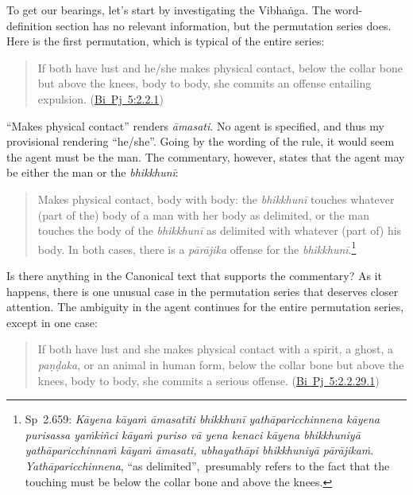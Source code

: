 \documentclass[12pt,openany]{book}%
\begin{document}
To get our bearings, let’s start by investigating the \textsanskrit{Vibhaṅga}. The word-definition section has no relevant information, but the permutation series does. Here is the first permutation, which is typical of the entire series:

\begin{quotation}%
If both have lust and he/she makes physical contact, below the collar bone but above the knees, body to body, she commits an offense entailing expulsion. (\href{https://suttacentral.net/pli-tv-bi-vb-pj5/en/brahmali\#2.2.1}{Bi~Pj~5:2.2.1})

%
\end{quotation}

“Makes physical contact” renders \textit{\textsanskrit{āmasati}}. No agent is specified, and thus my provisional rendering “he/she”. Going by the wording of the rule, it would seem the agent must be the man. The commentary, however, states that the agent may be either the man or the \textit{\textsanskrit{bhikkhunī}}:

\begin{quotation}%
Makes physical contact, body with body: the \textit{\textsanskrit{bhikkhunī}} touches whatever (part of the) body of a man with her body as delimited, or the man touches the body of the \textit{\textsanskrit{bhikkhunī}} as delimited with whatever (part of) his body. In both cases, there is a \textit{\textsanskrit{pārājika}} offense for the \textit{\textsanskrit{bhikkhunī}}.\footnote{Sp 2.659: \textit{\textsanskrit{Kāyena} \textsanskrit{kāyaṁ} \textsanskrit{āmasatīti} \textsanskrit{bhikkhunī} \textsanskrit{yathāparicchinnena} \textsanskrit{kāyena} purisassa \textsanskrit{yaṁkiñci} \textsanskrit{kāyaṁ} puriso \textsanskrit{vā} yena kenaci \textsanskrit{kāyena} \textsanskrit{bhikkhuniyā} \textsanskrit{yathāparicchinnaṁ} \textsanskrit{kāyaṁ} \textsanskrit{āmasati}, \textsanskrit{ubhayathāpi} \textsanskrit{bhikkhuniyā} \textsanskrit{pārājikaṁ}}. \textit{\textsanskrit{Yathāparicchinnena}}, “as delimited”, presumably refers to the fact that the touching must be below the collar bone and above the knees. }

%
\end{quotation}

Is there anything in the Canonical text that supports the commentary? As it happens, there is one unusual case in the permutation series that deserves closer attention. The ambiguity in the agent continues for the entire permutation series, except in one case:

\begin{quotation}%
If both have lust and she makes physical contact with a spirit, a ghost, a \textit{\textsanskrit{paṇḍaka}}, or an animal in human form, below the collar bone but above the knees, body to body, she commits a serious offense. (\href{https://suttacentral.net/pli-tv-bi-vb-pj5/en/brahmali\#2.2.29.1}{Bi~Pj~5:2.2.29.1})

%
\end{quotation}
\end{document}
